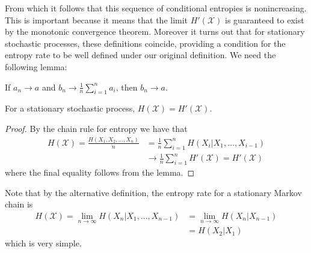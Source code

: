 From which it follows that this sequence of conditional entropies is nonincreasing. This is important because it means that the limit $H'(\mathcal{X})$ is guaranteed to exist by the monotonic convergence theorem. Moreover it turns out that for stationary stochastic processes, these definitions coincide, providing a condition for the entropy rate to be well defined under our original definition. We need the following lemma:
\begin{lemma}
	If $a_n \to a$ and $b_n \to \frac{1}{n}\sum_{i=1}^n a_i$, then $b_n \to a$. 
\end{lemma}
\begin{theorem}
	For a stationary stochastic process, $H(\mathcal{X}) = H'(\mathcal{X})$. 
\end{theorem}
\begin{proof}
	By the chain rule for entropy we have that 
	\begin{align}
		H(\mathcal{X}) = \frac{H(X_1,X_2,\ldots,X_n)}{n} &= \frac{1}{n}\sum_{i=1}^n H(X_i|X_1,\ldots,X_{i-1}) \\
		&\to \frac{1}{n}\sum_{i=1}^n H'(\mathcal{X}) = H'(\mathcal{X})
	\end{align}
where the final equality follows from the lemma. 
\end{proof}
Note that by the alternative definition, the entropy rate for a stationary Markov chain is 
\begin{align}
	H(\mathcal{X}) = \lim_{n \to \infty} H(X_n|X_1,\ldots,X_{n-1}) &= \lim_{n \to \infty} H(X_n|X_{n-1}) \\ &= H(X_2|X_1)
\end{align}
which is very simple. 
